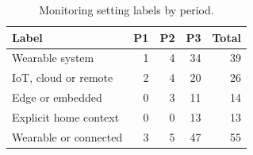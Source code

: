 \begin{table}[H]
\caption{Monitoring setting labels by period.}
\label{tab:deploy}
\centering
\footnotesize
\begin{tabularx}{\columnwidth}{@{}Yrrrr@{}}
\toprule
Label & P1 & P2 & P3 & Total \\
\midrule
Wearable system & 1 & 4 & 34 & 39 \\
IoT, cloud or remote & 2 & 4 & 20 & 26 \\
Edge or embedded & 0 & 3 & 11 & 14 \\
Explicit home context & 0 & 0 & 13 & 13 \\
Wearable or connected & 3 & 5 & 47 & 55 \\
\bottomrule
\end{tabularx}
\end{table}
